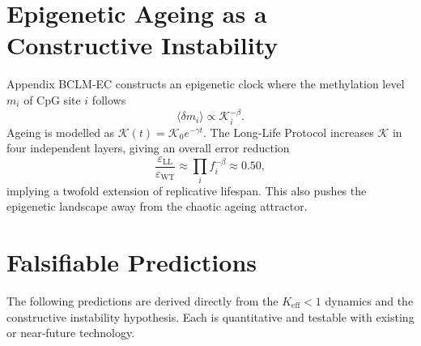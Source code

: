 \documentclass[12pt,a4paper]{article}
\newcommand{\Keff}{K_{\mathrm{eff}}}
\newcommand{\REL}{\mathcal{K}}
\begin{document}
	\section{Epigenetic Ageing as a Constructive Instability}
	
	Appendix BCLM‑EC constructs an epigenetic clock where the methylation level $m_i$
	of CpG site $i$ follows
	\[
	\langle \delta m_i \rangle \propto \REL_i^{-\beta}.
	\]
	Ageing is modelled as $\REL(t) = \REL_0 e^{-\gamma t}$. The Long‑Life Protocol
	increases $\REL$ in four independent layers, giving an overall error reduction
	\[
	\frac{\varepsilon_{\mathrm{LL}}}{\varepsilon_{\mathrm{WT}}} \approx \prod_i f_i^{-\beta}
	\approx 0.50,
	\]
	implying a twofold extension of replicative lifespan. This also pushes the epigenetic
	landscape away from the chaotic ageing attractor.
	
	\section{Falsifiable Predictions}
	
	The following predictions are derived directly from the $\Keff < 1$ dynamics and
	the constructive instability hypothesis. Each is quantitative and testable with
	existing or near‑future technology.
	
\end{document}
